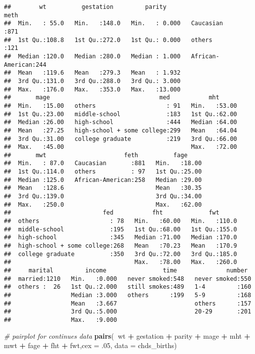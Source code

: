 \documentclass[]{article}
\newenvironment{Shaded}{\begin{snugshade}}{\end{snugshade}}
\newcommand{\KeywordTok}[1]{\textcolor[rgb]{0.13,0.29,0.53}{\textbf{#1}}}
\newcommand{\DataTypeTok}[1]{\textcolor[rgb]{0.13,0.29,0.53}{#1}}
\newcommand{\DecValTok}[1]{\textcolor[rgb]{0.00,0.00,0.81}{#1}}
\newcommand{\StringTok}[1]{\textcolor[rgb]{0.31,0.60,0.02}{#1}}
\newcommand{\CommentTok}[1]{\textcolor[rgb]{0.56,0.35,0.01}{\textit{#1}}}
\newcommand{\OperatorTok}[1]{\textcolor[rgb]{0.81,0.36,0.00}{\textbf{#1}}}
\newcommand{\NormalTok}[1]{#1}
\begin{document}
\begin{verbatim}
##        wt          gestation         parity                     meth    
##  Min.   : 55.0   Min.   :148.0   Min.   : 0.000   Caucasian       :871  
##  1st Qu.:108.8   1st Qu.:272.0   1st Qu.: 0.000   others          :121  
##  Median :120.0   Median :280.0   Median : 1.000   African-American:244  
##  Mean   :119.6   Mean   :279.3   Mean   : 1.932                         
##  3rd Qu.:131.0   3rd Qu.:288.0   3rd Qu.: 3.000                         
##  Max.   :176.0   Max.   :353.0   Max.   :13.000                         
##       mage                               med           mht       
##  Min.   :15.00   others                    : 91   Min.   :53.00  
##  1st Qu.:23.00   middle-school             :183   1st Qu.:62.00  
##  Median :26.00   high-school               :444   Median :64.00  
##  Mean   :27.25   high-school + some college:299   Mean   :64.04  
##  3rd Qu.:31.00   college graduate          :219   3rd Qu.:66.00  
##  Max.   :45.00                                    Max.   :72.00  
##       mwt                      feth          fage      
##  Min.   : 87.0   Caucasian       :881   Min.   :18.00  
##  1st Qu.:114.0   others          : 97   1st Qu.:25.00  
##  Median :125.0   African-American:258   Median :29.00  
##  Mean   :128.6                          Mean   :30.35  
##  3rd Qu.:139.0                          3rd Qu.:34.00  
##  Max.   :250.0                          Max.   :62.00  
##                          fed           fht             fwt       
##  others                    : 78   Min.   :60.00   Min.   :110.0  
##  middle-school             :195   1st Qu.:68.00   1st Qu.:155.0  
##  high-school               :345   Median :71.00   Median :170.0  
##  high-school + some college:268   Mean   :70.23   Mean   :170.9  
##  college graduate          :350   3rd Qu.:72.00   3rd Qu.:185.0  
##                                   Max.   :78.00   Max.   :260.0  
##     marital         income                time              number   
##  married:1210   Min.   :0.000   never smoked:548   never smoked:550  
##  others :  26   1st Qu.:2.000   still smokes:489   1-4         :160  
##                 Median :3.000   others      :199   5-9         :168  
##                 Mean   :3.667                      others      :157  
##                 3rd Qu.:5.000                      20-29       :201  
##                 Max.   :9.000
\end{verbatim}

\begin{Shaded}
\begin{Highlighting}[]
\CommentTok{# pairplot for continues data}
\KeywordTok{pairs}\NormalTok{(}\OperatorTok{~}\NormalTok{wt }\OperatorTok{+}\StringTok{ }\NormalTok{gestation }\OperatorTok{+}\StringTok{ }\NormalTok{parity }\OperatorTok{+}\StringTok{ }\NormalTok{mage }\OperatorTok{+}\StringTok{ }\NormalTok{mht }\OperatorTok{+}\StringTok{ }\NormalTok{mwt }\OperatorTok{+}\StringTok{ }\NormalTok{fage }\OperatorTok{+}\StringTok{ }\NormalTok{fht }\OperatorTok{+}\StringTok{ }\NormalTok{fwt,}\DataTypeTok{cex =}\NormalTok{ .}\DecValTok{05}\NormalTok{,  }\DataTypeTok{data =}\NormalTok{ chds_births)}
\end{Highlighting}
\end{Shaded}
\end{document}

